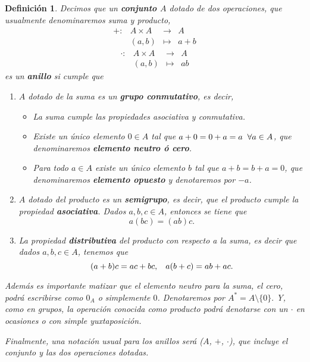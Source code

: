 \documentclass[12pt]{article}
\newtheorem{definition}[theorem]{Definición}
\begin{document}
\begin{definition} Decimos que un \textbf{conjunto $A$} dotado de dos operaciones, que usualmente denominaremos suma y producto, $$\begin{array}{rccl}
+ \colon &A \times A & \longrightarrow & A\\
&(a,b) & \longmapsto &a+b
\end{array}
$$
$$\begin{array}{rccl}
\cdot \colon &A \times A & \longrightarrow & A\\
&(a,b) & \longmapsto &ab
\end{array}
$$
es un \textbf{anillo} si cumple que \begin{enumerate}
\renewcommand{\theenumi}{\roman{enumi}}
\item $A$ dotado de la suma es un \textbf{grupo conmutativo}, es decir, \begin{itemize}
\item La suma cumple las propiedades asociativa y conmutativa.
\item Existe un único elemento $0 \in A$ tal que $a + 0 = 0 + a = a\hspace{0.2cm} \forall a \in A$, que denominaremos \textbf{elemento neutro ó cero}.
\item Para todo $a \in A$ existe un único elemento $b$ tal que $a + b = b +a = 0$, que denominaremos \textbf{elemento opuesto} y denotaremos por $-a$.
\end{itemize}
\item $A$ dotado del producto es un \textbf{semigrupo}, es decir, que el producto cumple la propiedad \textbf{asociativa}. Dados $a, b, c \in A$, entonces se tiene que $$a(bc)= (ab)c.$$
\item La propiedad \textbf{distributiva} del producto con respecto a la suma, es decir que dados $a,b,c \in A$, tenemos que $$(a+b)c = ac+bc, \hspace{0.3cm} a(b+c) = ab+ac.$$
\end{enumerate}
Además es importante matizar que el elemento neutro para la suma, el cero, podrá escribirse como $0_{A}$ o simplemente $0$. Denotaremos por $A^{\ast} = A\setminus \lbrace 0 \rbrace.$ Y, como en grupos, la operación conocida como producto podrá denotarse con un $\cdot$ en ocasiones o con simple yuxtaposición.

Finalmente, una notación usual para los anillos será ($A$, $+$, $\cdot$), que incluye el conjunto y las dos operaciones dotadas.
\end{definition}
\end{document}
